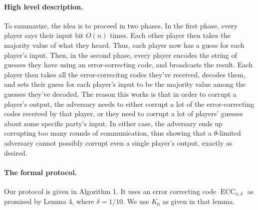 \documentclass[10pt,a4paper]{article}
\begin{document}
\paragraph{High level description.} To summarize, the idea is to proceed in two phases. In the first phase, every player says their input bit $O(n)$ times. Each other player then takes the majority value of what they heard. Thus, each player now has a guess for each player's input. Then, in the second phase, every player encodes the string of guesses they have using an error-correcting code, and broadcasts the result. Each player then takes all the error-correcitng codes they've received, decodes them, and sets their guess for each player's input to be the majority value among the guesses they've decoded.
The reason this works is that in order to corrupt a player's output, the adversary needs to either corrupt a lot of the error-correcting codes received by that player, or they need to corrupt a lot of players' guesses about some specific party's input. In either case, the adversary ends up corrupting too many rounds of communication, thus showing that a $\theta$-limited adversary cannot possibly corrupt even a single player's output, exactly as desired.
\paragraph{The formal protocol.} Our protocol is given in Algorithm 1. It uses an error correcting code $\operatorname{ECC}_{n,\delta}$ as promised by Lemma 4, where $\delta=1/10$. We use $K_0$ as given in that lemma.
\end{document}
